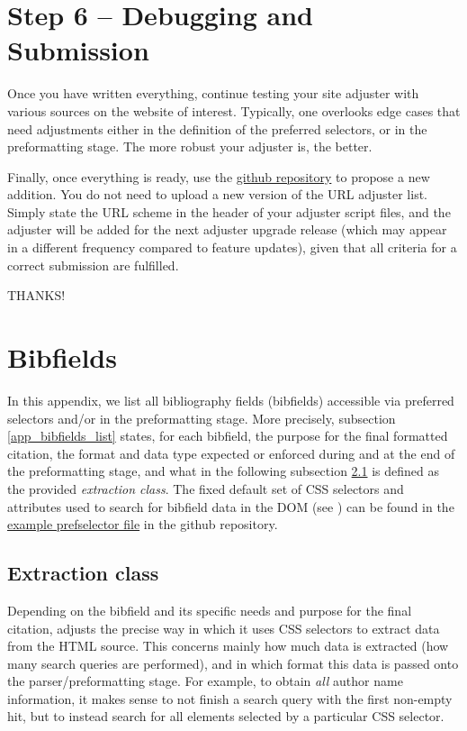 \documentclass[
a4paper,
12pt,
]
{article}
\begin{document}
\section{Step 6 -- Debugging and Submission}\label{sec_6}

Once you have written everything, continue testing your site adjuster with various sources on the website of interest. Typically, one overlooks edge cases that need adjustments either in the definition of the preferred selectors, or in the preformatting stage. The more robust your adjuster is, the better.\par

Finally, once everything is ready, use the \href{https://github.com/Langenscheiss/bibitnow}{github repository} to propose a new addition. You do not need to upload a new version of the URL adjuster list. Simply state the URL scheme in the header of your adjuster script files, and the adjuster will be added for the next adjuster upgrade release (which may appear in a different frequency compared to feature updates), given that all criteria for a correct submission are fulfilled.

THANKS!

\appendix
 \section{Bibfields}\label{app_bibfields}
 
 In this appendix, we list all bibliography fields (bibfields) accessible via preferred selectors and/or in the preformatting stage. More precisely, subsection \ref{app_bibfields_list} states, for each bibfield, the purpose for the final formatted citation, the format and data type expected or enforced during and at the end of the preformatting stage, and what in the following subsection \ref{app_bibfields_class} is defined as the provided \textit{extraction class}. 
 The fixed default set of CSS selectors and attributes used to search for bibfield data in the DOM (see ) can be found in the \href{https://github.com/Langenscheiss/bibitnow/blob/master/extractors/prefselectors/0_EXAMPLE.js}{example prefselector file} in the github repository.
 
 \subsection{Extraction class}\label{app_bibfields_class} 
 Depending on the bibfield and its specific needs and purpose for the final citation, {\plgname} adjusts the precise way in which it uses CSS selectors to extract data from the HTML source. This concerns mainly how much data is extracted (how many search queries are performed), and in which format this data is passed onto the parser/preformatting stage. For example, to obtain \emph{all} author name information, it makes sense to not finish a search query with the first non-empty hit, but to instead search for all elements selected by a particular CSS selector.\par
 
\end{document}
